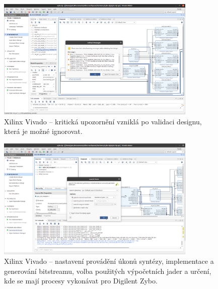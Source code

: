 \documentclass[a4paper, twoside, 11pt]{article}
\begin{document}
\begin{appendices}
		\begin{figure}[htbp!]
			\centering
			\includegraphics[width=0.85\textwidth]{src/png/zybo-xilinx-vivado-flow/zybo-xilinx-vivado-flow-24.jpg}
			\caption{Xilinx Vivado – kritická upozornění vzniklá po validaci designu, která je možné ignorovat.}
			\label{fig:zybo-xilinx-vivado-flow-24}
		\end{figure}


		\begin{figure}[htbp!]
			\centering
			\includegraphics[width=0.85\textwidth]{src/png/zybo-xilinx-vivado-flow/zybo-xilinx-vivado-flow-29.jpg}
			\caption{Xilinx Vivado – nastavení provádění úkonů syntézy, implementace a generování bitstreamu, volba použitých výpočetních jader a určení, kde se mají procesy vykonávat pro Digilent Zybo.}
			\label{fig:zybo-xilinx-vivado-flow-29}
		\end{figure}


\end{appendices}
\end{document}
